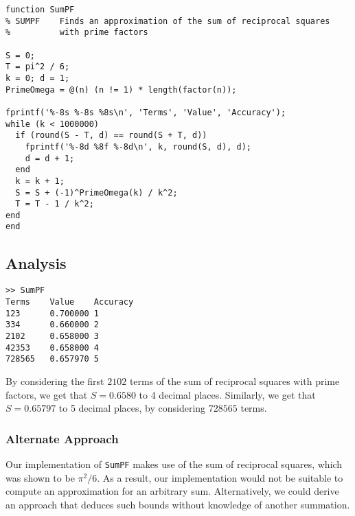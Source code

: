 \begin{lstlisting}
function SumPF
% SUMPF    Finds an approximation of the sum of reciprocal squares
%          with prime factors

S = 0;
T = pi^2 / 6;
k = 0; d = 1;
PrimeOmega = @(n) (n != 1) * length(factor(n));

fprintf('%-8s %-8s %8s\n', 'Terms', 'Value', 'Accuracy');
while (k < 1000000)
  if (round(S - T, d) == round(S + T, d))
    fprintf('%-8d %8f %-8d\n', k, round(S, d), d);
    d = d + 1;
  end
  k = k + 1;
  S = S + (-1)^PrimeOmega(k) / k^2;
  T = T - 1 / k^2;
end
end
\end{lstlisting}


\subsection{Analysis}

\begin{lstlisting}
>> SumPF
Terms    Value    Accuracy
123      0.700000 1       
334      0.660000 2       
2102     0.658000 3       
42353    0.658000 4       
728565   0.657970 5       
\end{lstlisting}

\begin{example}
	By considering the first $2102$ terms of the sum of reciprocal squares with prime factors, we get that $S = 0.6580$ to 4 decimal places. Similarly, we get that $S = 0.65797$ to 5 decimal places, by considering $728565$ terms.
\end{example}

\subsubsection{Alternate Approach}
Our implementation of \lstinline|SumPF| makes use of the sum of reciprocal squares, which was shown to be $\pi^2 / 6$. As a result, our implementation would not be suitable to compute an approximation for an arbitrary sum. Alternatively, we could derive an approach that deduces such bounds without knowledge of another summation.
